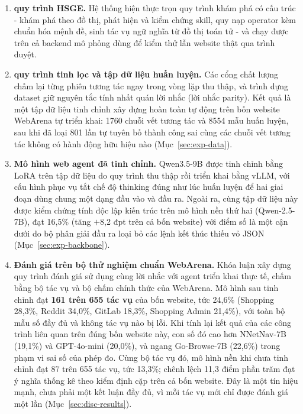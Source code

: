 \begin{enumerate}

  \item \textbf{quy trình HSGE.}
    Hệ thống hiện thực trọn quy trình khám phá có cấu trúc - khám phá theo đồ thị,
    phát hiện và kiểm chứng skill, quy nạp operator kèm chuẩn hóa mệnh đề, sinh
    tác vụ ngữ nghĩa từ đồ thị toán tử - và chạy được trên cả backend mô phỏng dùng
    để kiểm thử lẫn website thật qua trình duyệt.

  \item \textbf{quy trình tinh lọc và tập dữ liệu huấn luyện.}
    Các cổng chất lượng chấm lại từng phiên tương tác ngay trong vòng lặp thu thập, và
    trình dựng dataset giữ nguyên tắc tính nhất quán lời nhắc (lời nhắc parity). Kết quả là một tập dữ liệu
    tinh chỉnh xây dựng hoàn toàn tự động trên bốn website WebArena tự triển
    khai: 1760 chuỗi vết tương tác và 8554 mẫu huấn luyện, sau khi đã loại 801 lần tự tuyên
    bố thành công sai cùng các chuỗi vết tương tác không có hành động hữu hiệu nào
    (Mục~\ref{sec:exp-data}).

  \item \textbf{Mô hình web agent đã tinh chỉnh.}
    Qwen3.5-9B được tinh chỉnh bằng LoRA trên tập dữ liệu do quy trình thu thập rồi
    triển khai bằng vLLM, với cấu hình phục vụ tắt chế độ thinking đúng như lúc
    huấn luyện để hai giai đoạn dùng chung một dạng đầu vào và đầu ra. Ngoài ra,
    cùng tập dữ liệu này được kiểm chứng tính độc lập kiến trúc trên mô hình nền
    thứ hai (Qwen-2.5-7B), đạt 16{,}5\% (tăng $+$8{,}2 đpt trên cả bốn website)
    với điểm số là một cận dưới do bộ phân giải đầu ra loại bỏ các lệnh kết thúc
    thiếu vỏ JSON (Mục~\ref{sec:exp-backbone}).

  \item \textbf{Đánh giá trên bộ thử nghiệm chuẩn WebArena.}
    Khóa luận xây dựng quy trình đánh giá sử dụng cùng lời nhắc với agent triển khai
    thực tế, chấm bằng bộ tác vụ và bộ chấm chính thức của WebArena. Mô hình sau
    tinh chỉnh đạt \textbf{161 trên 655 tác vụ} của bốn website, tức 24{,}6\%
    (Shopping 28{,}3\%, Reddit 34{,}0\%, GitLab 18{,}3\%, Shopping Admin
    21{,}4\%), với toàn bộ mẫu số đầy đủ và không tác vụ nào bị lỗi. Khi tính lại
    kết quả của các công trình liên quan trên đúng bốn website này, con số đó
    cao hơn NNetNav-7B (19{,}1\%) và GPT-4o-mini (20{,}0\%), và ngang
    Go-Browse-7B (22{,}6\%) trong phạm vi sai số của phép đo. Cùng bộ tác vụ đó, mô
    hình nền khi chưa tinh chỉnh đạt 87 trên 655 tác vụ, tức 13{,}3\%; chênh lệch
    11{,}3 điểm phần trăm đạt ý nghĩa thống kê theo kiểm định cặp trên cả bốn
    website. Đây là một tín hiệu mạnh, chưa phải một kết luận đầy đủ, vì mỗi tác vụ
    mới chỉ được đánh giá một lần
    (Mục~\ref{sec:disc-results}).


\end{enumerate}
